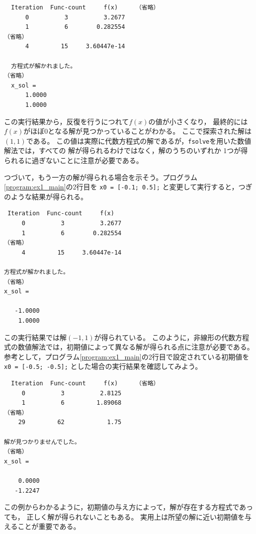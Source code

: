 \documentclass[tombow,dvipdfmx]{corona-a5-1.1}
\begin{document}
\begin{例}[代数方程式の解の探索]
\smallskip
\begin{実行結果}
\begin{verbatim}
  Iteration  Func-count     f(x)     （省略）
      0          3          3.2677
      1          6        0.282554
（省略）
      4         15     3.60447e-14

  方程式が解かれました。
（省略）
  x_sol =
      1.0000
      1.0000
\end{verbatim}
\end{実行結果}

この実行結果から，反復を行うにつれて$f(x)$の値が小さくなり，
最終的には$f(x)$がほぼ0となる解が見つかっていることがわかる。
ここで探索された解は$(1, 1)$である。
この値は実際に代数方程式の解であるが，\verb|fsolve|を用いた数値解法では，すべての
解が得られるわけではなく，解のうちのいずれか
1つが得られるに過ぎないことに注意が必要である。


つづいて，もう一方の解が得られる場合を示そう。プログラム\nobreak\ref{program:ex1_main}の2行目を
\verb|x0 = [-0.1; 0.5];|
と変更して実行すると，つぎのような結果が得られる。

\smallskip
\begin{実行結果}
\begin{verbatim}
 Iteration  Func-count     f(x)   
     0          3          3.2677
     1          6        0.282554
（省略）
     4         15     3.60447e-14

方程式が解かれました。
（省略）
x_sol =

   -1.0000
    1.0000
\end{verbatim}
\end{実行結果}

この実行結果では解$(-1, 1)$が得られている。
このように，非線形の代数方程式の数値解法では，初期値によって異なる解が得られる点に注意が必要である。
参考として，プログラム\nobreak\ref{program:ex1_main}の2行目で設定されている初期値を
\verb|x0 = [-0.5; -0.5];|
とした場合の実行結果を確認してみよう。

\smallskip
\begin{実行結果}
    \begin{verbatim}
  Iteration  Func-count     f(x)     （省略）
     0          3          2.8125
     1          6         1.89068
（省略）
    29         62            1.75

解が見つかりませんでした。
（省略）
x_sol =

    0.0000
   -1.2247
\end{verbatim}
\end{実行結果}

この例からわかるように，初期値の与え方によって，解が存在する方程式であっても，
正しく解が得られないこともある。
実用上は所望の解に近い初期値を与えることが重要である。
\end{例}
\end{document}
